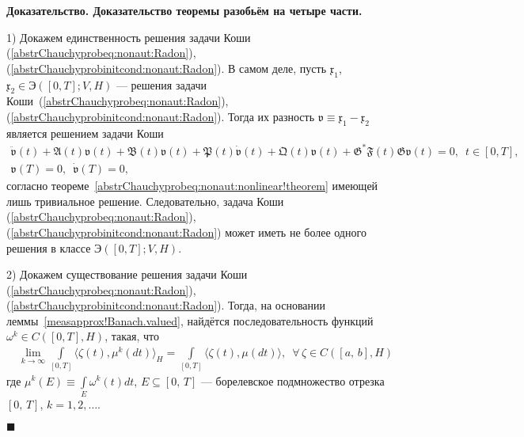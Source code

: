 \documentclass{report}
\newcounter{rem}[section]
\newcounter{theor}[section]
\newenvironment{Proof}{\par\noindent\bf Доказательство.\rm}{ $\blacksquare$\par}
\begin{document}
\begin{Proof}
Доказательство теоремы разобьём на четыре части.

1) Докажем единственность решения задачи Коши (\ref{abstrChauchyprobeq:nonaut:Radon}), (\ref{abstrChauchyprobinitcond:nonaut:Radon}). В самом деле, пусть $\mathfrak{x}_1$, $\mathfrak{x}_2\in{\textrm{Э}}([0,T];V,H)$ --- решения задачи Коши~(\ref{abstrChauchyprobeq:nonaut:Radon}), (\ref{abstrChauchyprobinitcond:nonaut:Radon}). Тогда их разность $\mathfrak{v}\equiv\mathfrak{x}_1-\mathfrak{x}_2$ является решением задачи Коши
\begin{gather}\label{abstrChauchyprobeq:nonaut:Radon:v}
\ddot{\mathfrak{v}}(t)+\mathfrak{A}(t){\mathfrak{v}}(t)+\mathfrak{B}(t){\mathfrak{v}}(t) + \mathfrak{P}(t)\dot{\mathfrak{v}}(t) + \mathfrak{Q}(t){\mathfrak{v}}(t)  + \mathfrak{G}^*\mathfrak{F}(t)\mathfrak{G}{\mathfrak{v}}(t) = 0,\,\,\,t\in[0,T],\\
\label{abstrChauchyprobinitcond:nonaut:Radon:v}
{\mathfrak{v}}(T)=0,\,\,\,\dot{\mathfrak{v}}(T)=0,
\end{gather}
согласно теореме~\ref{abstrChauchyprobeq:nonaut:nonlinear!theorem} имеющей лишь тривиальное решение. Следовательно, задача Коши (\ref{abstrChauchyprobeq:nonaut:Radon}), (\ref{abstrChauchyprobinitcond:nonaut:Radon}) может иметь не более одного решения в классе ${\textrm{Э}}([0,T];V,H)$.

2) Докажем существование решения задачи Коши (\ref{abstrChauchyprobeq:nonaut:Radon}), (\ref{abstrChauchyprobinitcond:nonaut:Radon}). Тогда, на основании леммы~\ref{measapprox!Banach.valued}, найдётся последовательность функций $\omega^k\in C([0,T],H)$, такая, что
\begin{gather}\label{muk.convergence}
\lim\limits_{k\to\infty}\int\limits_{[0,T]}\langle\zeta(t),\mu^k(dt)\rangle_H=\int\limits_{[0,T]}\langle\zeta(t),\mu(dt)\rangle, \,\,\,\forall\,\zeta\in C([a,\,b],H)
\end{gather}
где $\displaystyle\mu^k(E)\equiv\int\limits_E\omega^k(t)dt$, $E\subseteq [0,\,T]$ --- борелевское подмножество отрезка $[0,\,T]$, $k=1,2,\dots$.


\end{Proof}
\end{document}
